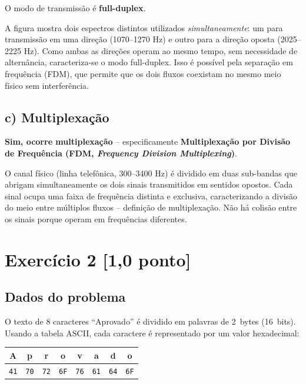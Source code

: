 \documentclass[12pt,a4paper]{article}
\begin{document}
O modo de transmissão é \textbf{full-duplex}.

A figura mostra dois espectros distintos utilizados \textit{simultaneamente}: um para transmissão em uma direção (1070--1270 Hz) e outro para a direção oposta (2025--2225 Hz). Como ambas as direções operam ao mesmo tempo, sem necessidade de alternância, caracteriza-se o modo full-duplex. Isso é possível pela separação em frequência (FDM), que permite que os dois fluxos coexistam no mesmo meio físico sem interferência.

\subsection*{c) Multiplexação}

\textbf{Sim, ocorre multiplexação} -- especificamente \textbf{Multiplexação por Divisão de Frequência (FDM, \textit{Frequency Division Multiplexing})}.

O canal físico (linha telefônica, 300--3400 Hz) é dividido em duas sub-bandas que abrigam simultaneamente os dois sinais transmitidos em sentidos opostos. Cada sinal ocupa uma faixa de frequência distinta e exclusiva, caracterizando a divisão do meio entre múltiplos fluxos -- definição de multiplexação. Não há colisão entre os sinais porque operam em frequências diferentes.

\vspace{1em}

\section*{Exercício 2 \hfill \normalfont\small[1,0 ponto]}

\subsection*{Dados do problema}

O texto de 8 caracteres ``Aprovado'' é dividido em palavras de 2~bytes (16~bits).
Usando a tabela ASCII, cada caractere é representado por um valor hexadecimal:

\begin{center}
\begin{tabular}{|c|c|c|c|c|c|c|c|}
\hline
\rowcolor{destaque!30}
\textbf{A} & \textbf{p} & \textbf{r} & \textbf{o} &
\textbf{v} & \textbf{a} & \textbf{d} & \textbf{o} \\
\hline
\texttt{41} & \texttt{70} & \texttt{72} & \texttt{6F} &
\texttt{76} & \texttt{61} & \texttt{64} & \texttt{6F} \\
\hline
\end{tabular}
\end{center}
\end{document}
